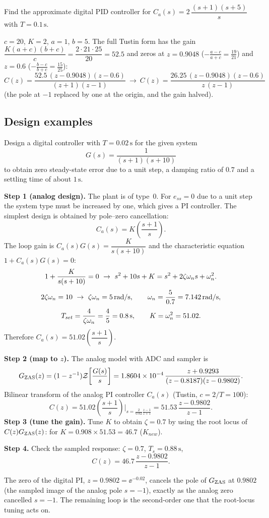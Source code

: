 \begin{problem}[PID]
Find the approximate digital PID controller for $C_a(s)=2\,\dfrac{(s+1)(s+5)}{s}$ with $T=0.1\,\mathrm{s}$.
\end{problem}
\begin{solution}
$c=20$, $K=2$, $a=1$, $b=5$. The full Tustin form has the gain $\dfrac{K(a+c)(b+c)}{c}=\dfrac{2\cdot21\cdot25}{20}=52.5$ and zeros at
$z=0.9048$ ($-\tfrac{a-c}{a+c}=\tfrac{19}{21}$) and $z=0.6$ ($-\tfrac{b-c}{b+c}=\tfrac{15}{25}$):
\[
  C(z)=\frac{52.5\,(z-0.9048)(z-0.6)}{(z+1)(z-1)}\ \longrightarrow\ C(z)=\frac{26.25\,(z-0.9048)(z-0.6)}{z\,(z-1)}
\]
(the pole at $-1$ replaced by one at the origin, and the gain halved).
\end{solution}

\subsection{Design examples}
\begin{example}
Design a digital controller with $T=0.02\,\mathrm{s}$ for the given system
\[
  G(s)=\frac{1}{(s+1)(s+10)}
\]
to obtain zero steady-state error due to a unit step, a damping ratio of $0.7$ and a settling time of about $1\,\mathrm{s}$.

\medskip
\textbf{Step 1 (analog design).} The plant is of type~0. For $e_{ss}=0$ due to a unit step the system type must be increased by one,
which gives a PI controller. The simplest design is obtained by pole--zero cancellation:
\[
  C_a(s)=K\left(\frac{s+1}{s}\right).
\]
The loop gain is $C_a(s)G(s)=\dfrac{K}{s(s+10)}$ and the characteristic equation $1+C_a(s)G(s)=0$:
\[
  1+\frac{K}{s(s+10)}=0\ \to\ s^{2}+10s+K=s^{2}+2\zeta\wn s+\wn^{2}.
\]
\[
  2\zeta\wn=10\ \to\ \zeta\wn=5\,\mathrm{rad/s},\qquad \wn=\frac{5}{0.7}=7.142\,\mathrm{rad/s},
\]
\[
  T_{set}=\frac{4}{\zeta\omega_n}=\frac45=0.8\,\mathrm{s},\qquad K=\omega_n^{2}=51.02.
\]
Therefore $C_a(s)=51.02\left(\dfrac{s+1}{s}\right)$.

\textbf{Step 2 (map to $z$).} The analog model with ADC and sampler is
\[
  G_{\mathrm{ZAS}}(z)=(1-z^{-1})\mathcal{Z}\!\left[\frac{G(s)}{s}\right]=1.8604\times10^{-4}\,\frac{z+0.9293}{(z-0.8187)(z-0.9802)}.
\]
Bilinear transform of the analog PI controller $C_a(s)$ (Tustin, $c=2/T=100$):
\[
  C(z)=51.02\left(\frac{s+1}{s}\right)\Big|_{s=\frac{2}{0.02}\frac{z-1}{z+1}}=51.53\,\frac{z-0.9802}{z-1}.
\]
\textbf{Step 3 (tune the gain).} Tune $K$ to obtain $\zeta=0.7$ by using the root locus of $C(z)G_{\mathrm{ZAS}}(z)$: for
$K=0.908\times51.53=46.7$ ($K_{new}$).

\textbf{Step 4.} Check the sampled response: $\zeta=0.7$, $T_s=0.88\,\mathrm{s}$,
\[
  C(z)=46.7\,\frac{z-0.9802}{z-1}.
\]
\end{example}
The zero of the digital PI, $z=0.9802=\ee^{-0.02}$, cancels the pole of $G_{\mathrm{ZAS}}$ at $0.9802$ (the sampled image of the analog pole $s=-1$),
exactly as the analog zero cancelled $s=-1$. The remaining loop is the second-order one that the root-locus tuning acts on.

